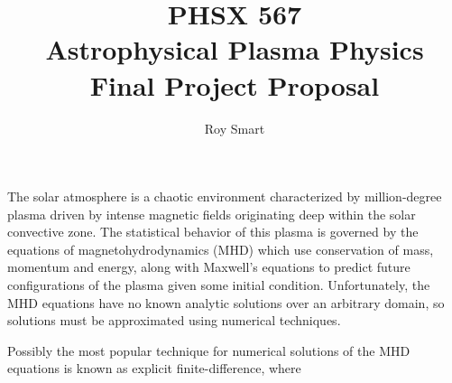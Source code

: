 \documentclass[10pt,letterpaper]{article}
\title{PHSX 567 \\ Astrophysical Plasma Physics \\ Final Project Proposal}
\author{Roy Smart}
\begin{document}
	
	\maketitle
	
	\noindent
	The solar atmosphere is a chaotic environment characterized by million-degree plasma driven by intense magnetic fields originating deep within the solar convective zone. 
	The statistical behavior of this plasma is governed by the equations of magnetohydrodynamics (MHD) which use conservation of mass, momentum and energy, along with Maxwell's equations to predict future configurations of the plasma given some initial condition. 
	Unfortunately, the MHD equations have no known analytic solutions over an arbitrary domain, so solutions must be approximated using numerical techniques.
	
	Possibly the most popular technique for numerical solutions of the MHD equations is known as explicit finite-difference, where
	
\end{document}
